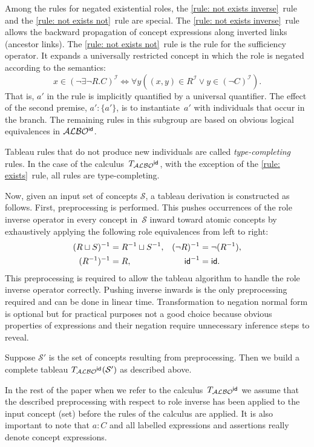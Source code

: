 \documentclass[leqno
,pdflatex
,prodmode
,acmtocl
]{acmsmall}
\newcommand{\mathcmd}[1]{\ensuremath{#1}\xspace}
\newcommand{\dlfont}{\mathcal}
\newcommand{\dl}[1]{\mathcmd{\dlfont{#1}}}
\newcommand{\idRole}{\mathcmd{\textsf{\upshape\mdseries id}}}
\newcommand{\ALBOid}{\dl{ALBO\smash[t]{\mbox{${}^{\idRole}$}}}}
\def\Not{\neg}
\def\Or{\sqcup}
\newcommand{\indiv}{a}
\newcommand{\I}{\mathcal{I}}
\begin{document}
Among the rules for negated existential roles,
the \eqref{rule: not exists inverse}~rule and
the \eqref{rule: not exists not}~rule
are special.
The \eqref{rule: not exists inverse}~rule
allows the backward propagation of concept expressions
along inverted links (ancestor links).
The \eqref{rule: not exists not}~rule is the rule for the sufficiency
operator.
It expands a universally restricted concept in which the role is
negated according to the semantics: 
\[
x \in (\Not\exists\Not R.C)^\I \iff
\forall y \left( (x,y) \in R^\I \vee y \in (\Not C)^\I\right).
\]
That is, $\indiv'$ in the rule is implicitly quantified by a universal quantifier.
The effect of the second premise, $\indiv':\{\indiv'\}$, is to
instantiate~$\indiv'$ with individuals that occur in the branch.
The remaining rules in this subgroup are based on obvious logical
equivalences in \ALBOid.

Tableau rules that do not produce new individuals
are called \emph{type-completing} rules.
In the case of the calculus~$T_\ALBOid$, with the exception of
the \eqref{rule: exists}~rule, all rules are type-completing.

Now, given an input set of concepts $\mathcal{S}$, a tableau derivation is constructed
as follows.
First, preprocessing is performed. This pushes
occurrences of the role inverse operator in every concept in~$\mathcal{S}$
inward toward atomic concepts by exhaustively
applying the following role equivalences from left to right:
\begin{align*}
(R\Or S)^{-1} & =R^{-1}\Or S^{-1},&
(\Not R)^{-1} & =\Not(R^{-1}),\\
(R^{-1})^{-1} & =R,&
\idRole^{-1} & = \idRole.
\end{align*}
This preprocessing is required to allow the tableau algorithm to
handle the role inverse operator correctly. Pushing inverse inwards is the only
preprocessing required and can be done in linear time.
Transformation to negation normal form is optional
but for practical
purposes not a good choice because obvious properties of expressions and
their negation require unnecessary inference steps to reveal.

Suppose $\mathcal{S}'$ is the set of concepts resulting from
preprocessing.
Then we build a complete tableau $T_\ALBOid(\mathcal{S}')$  
as described above.

In the rest of the paper when we refer to the calculus~$T_\ALBOid$ we assume that
the described preprocessing with respect to role inverse has been
applied to the input concept (set) before the
rules of the calculus are applied.
It is also important to note that $\indiv:C$ and all labelled
expressions and assertions really denote concept expressions.
\end{document}
